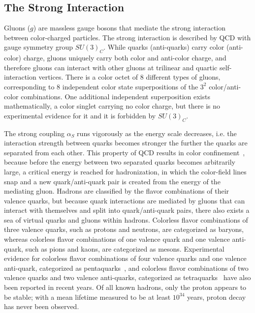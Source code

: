 \begin{refsection}
\subsection{The Strong Interaction}
Gluons ($g$) are massless gauge bosons that mediate the strong interaction between color-charged particles.
The strong interaction is described by QCD with gauge symmetry group $SU(3)_C$.
While quarks (anti-quarks) carry color (anti-color) charge, gluons uniquely carry both color and anti-color charge, and therefore gluons can interact with other gluons at trilinear and quartic self-interaction vertices.
There is a color octet of 8 different types of gluons, corresponding to 8 independent color state superpositions of the $3^2$ color/anti-color combinations.
One additional independent superposition exists mathematically, a color singlet carrying no color charge, but there is no experimental evidence for it and it is forbidden by $SU(3)_C$.

The strong coupling $\alpha_S$ runs vigorously as the energy scale decreases, i.e. the interaction strength between quarks becomes stronger the further the quarks are separated from each other.
This property of QCD results in color confinement~\cite{FRITZSCH1973365}, because before the energy between two separated quarks becomes arbitrarily large, a critical energy is reached for hadronization, in which the color-field lines snap and a new quark/anti-quark pair is created from the energy of the mediating gluon.
Hadrons are classified by the flavor combinations of their valence quarks, but because quark interactions are mediated by gluons that can interact with themselves and split into quark/anti-quark pairs, there also exists a sea of virtual quarks and gluons within hadrons.
Colorless flavor combinations of three valence quarks, such as protons and neutrons, are categorized as baryons, whereas colorless flavor combinations of one valence quark and one valence anti-quark, such as pions and kaons, are categorized as mesons.
Experimental evidence for colorless flavor combinations of four valence quarks and one valence anti-quark, categorized as pentaquarks~\cite{PhysRevLett.115.072001}, and colorless flavor combinations of two valence quarks and two valence anti-quarks, categorized as tetraquarks~\cite{PhysRevLett.110.252002} have also been reported in recent years.
Of all known hadrons, only the proton appears to be stable; with a mean lifetime measured to be at least $10^{34}$ years, proton decay has never been observed.


\end{refsection}
